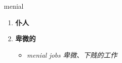 
\begin{frame}
{\huge menial}
\begin{center}
\begin{enumerate}\Large
  \item \textbf{仆人}
  \item \textbf{卑微的}
  \begin{itemize}
    \item \em{\Large{menial jobs 卑微、下贱的工作}}
  \end{itemize}
\end{enumerate}
\end{center}
\end{frame}

